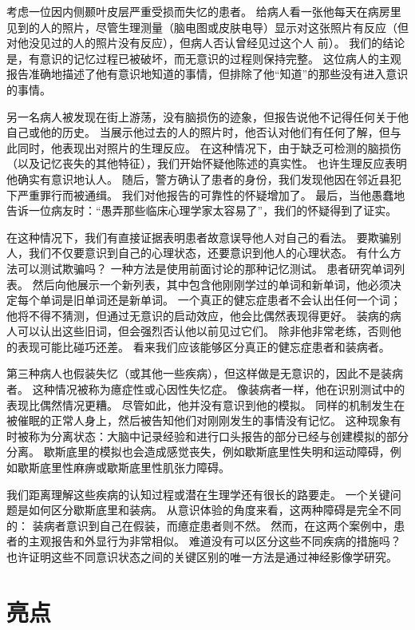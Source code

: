 考虑一位因内侧颞叶皮层严重受损而失忆的患者。
给病人看一张他每天在病房里见到的人的照片，尽管生理测量（脑电图或皮肤电导）显示对这张照片有反应（但对他没见过的人的照片没有反应），但病人否认曾经见过这个人 前）。
我们的结论是，有意识的记忆过程已被破坏，而无意识的过程则保持完整。
这位病人的主观报告准确地描述了他有意识地知道的事情，但排除了他“知道”的那些没有进入意识的事情。


另一名病人被发现在街上游荡，没有脑损伤的迹象，但报告说他不记得任何关于他自己或他的历史。
当展示他过去的人的照片时，他否认对他们有任何了解，但与此同时，他表现出对照片的生理反应。
在这种情况下，由于缺乏可检测的脑损伤（以及记忆丧失的其他特征），我们开始怀疑他陈述的真实性。
也许生理反应表明他确实有意识地认人。
随后，警方确认了患者的身份，我们发现他因在邻近县犯下严重罪行而被通缉。
我们对他报告的可靠性的怀疑增加了。
最后，当他愚蠢地告诉一位病友时：“愚弄那些临床心理学家太容易了”，我们的怀疑得到了证实。


在这种情况下，我们有直接证据表明患者故意误导他人对自己的看法。
要欺骗别人，我们不仅要意识到自己的心理状态，还要意识到他人的心理状态。
有什么方法可以测试欺骗吗？
一种方法是使用前面讨论的那种记忆测试。
患者研究单词列表。
然后向他展示一个新列表，其中包含他刚刚学过的单词和新单词，他必须决定每个单词是旧单词还是新单词。
一个真正的健忘症患者不会认出任何一个词；
他将不得不猜测，但通过无意识的启动效应，他会比偶然表现得更好。
装病的病人可以认出这些旧词，但会强烈否认他以前见过它们。
除非他非常老练，否则他的表现可能比碰巧还差。
看来我们应该能够区分真正的健忘症患者和装病者。


第三种病人也假装失忆（或其他一些疾病），但这样做是无意识的，因此不是装病者。
这种情况被称为癔症性或心因性失忆症。
像装病者一样，他在识别测试中的表现比偶然情况更糟。
尽管如此，他并没有意识到他的模拟。
同样的机制发生在被催眠的正常人身上，然后被告知他们对刚刚发生的事情没有记忆。
这种现象有时被称为分离状态：大脑中记录经验和进行口头报告的部分已经与创建模拟的部分分离。
歇斯底里的模拟也会造成感觉丧失，例如歇斯底里性失明和运动障碍，例如歇斯底里性麻痹或歇斯底里性肌张力障碍。


我们距离理解这些疾病的认知过程或潜在生理学还有很长的路要走。
一个关键问题是如何区分歇斯底里和装病。
从意识体验的角度来看，这两种障碍是完全不同的：
装病者意识到自己在假装，而癔症患者则不然。
然而，在这两个案例中，患者的主观报告和外显行为非常相似。
难道没有可以区分这些不同疾病的措施吗？
也许证明这些不同意识状态之间的关键区别的唯一方法是通过神经影像学研究。



\section{亮点}

